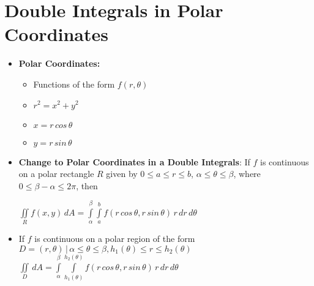 \documentclass{report}
\begin{document}
	\section{Double Integrals in Polar Coordinates}
		\begin{itemize}\addtolength{\leftskip}{2em}
			\item \textbf{Polar Coordinates:}
				\begin{itemize}\addtolength{\leftskip}{4em}
				\item Functions of the form $f(r,\theta)$
				\item $r^2=x^2+y^2$
				\item $x=r\,cos\,\theta$
				\item $y=r\,sin\,\theta$
				\end{itemize}
			\item \textbf{Change to Polar Coordinates in a Double Integrals}: If $f$ is continuous on a polar rectangle $R$ given by $0\le a \le r \le b$, $\alpha \le \theta \le \beta $, where $0\le \beta - \alpha \le 2\pi$, then 
			\begin{center}
				$\iint\limits_{R}f(x,y)\,dA=\int\limits_{\alpha}^{\beta}\int\limits_{a}^{b}f(r\,cos\,\theta,r\,sin\,\theta)\,r\,dr\,d\theta$
			\end{center}
			\item  If $f$ is continuous on a polar region of the form $D={(r,\theta)\,|\,\alpha \le \theta \le \beta, h_1(\theta)\le r \le h_2(\theta)}$
			\subsubitem $\iint\limits_{D}^{}\,dA=\int\limits_{\alpha}^{\beta}\int\limits_{h_1(\theta)}^{h_2(\theta)}f(r\,cos\,\theta,r\,sin\,\theta)\,r\,dr\,d\theta$
		\end{itemize}
\end{document}
